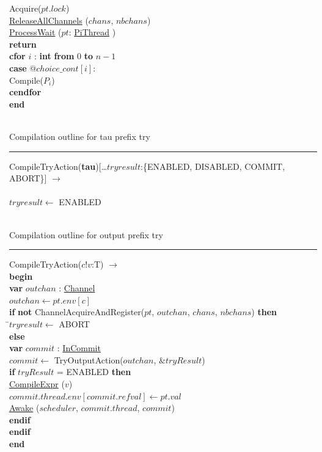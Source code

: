 \documentclass[a4paper,11pt]{article}
\newenvironment{program}{
  \begin{sffamily}
  \begin{scriptsize}
  \begin{tabbing}}
 {\end{tabbing}
  \end{scriptsize}
  \end{sffamily}}
\newcommand{\kw}[1]{\textsf{\textbf{#1}}}
\newcommand{\pindent}{\hspace{2em}\=}
\newcommand{\compiletime}[1]{\textcolor{compilecolor}{#1}}
\newcommand{\synchro}[1]{\textcolor{synchrocolor}{#1}}
\newcommand{\algotitle}[1]{\noindent\\ \noindent#1\par\nobreak\vspace{3pt}\hrule\vspace{6pt}}
\newcommand{\algosection}[1]{
  \phantomsection
  \algotitle{#1}
}
\newcommand{\myref}[1]{
  \hyperref[#1]{#1}
}
\begin{document}
\begin{program}
  \>\synchro{Acquire($pt.lock$)} \\
  \>\synchro{\myref{ReleaseAllChannels}($chans$, $nbchans$)} \\
  \>\synchro{\myref{ProcessWait}($pt$:\myref{PiThread})} \\
  \>\kw{return} \\
  \>\compiletime{\kw{cfor} $i$ : \kw{int} \kw{from} $0$ \kw{to} $n-1$} \\
  \>\pindent \kw{case} $@choice\_cont[i]:$ \\
  \>\>\compiletime{Compile($P_i$)} \\
  \>\compiletime{\kw{cendfor}} \\
  \kw{end}
\end{program}

\label{CompileTryAction}
\algosection{Compilation outline for tau prefix try}
\begin{program}
  \compiletime{CompileTryAction(\kw{tau})}[\ldots $tryresult$:\{ENABLED, DISABLED, COMMIT, ABORT\}] $\rightarrow$ \\ \\
  $tryresult \leftarrow$ ENABLED \\
\end{program}

\algosection{Compilation outline for output prefix try}
\begin{program}
  \compiletime{CompileTryAction($c!v$:T)} $\rightarrow$ \\ 
  \kw{begin} \\
  \pindent \kw{var} $outchan$ : \myref{Channel} \\
  \> $outchan \leftarrow pt.env[c]$ \\
  \> \kw{if} \kw{not} ChannelAcquireAndRegister($pt$, $outchan$, $chans$, $nbchans$) \kw{then} \\
  \> \pindent $tryresult \leftarrow$ ABORT \\
  \> \kw{else} \\
  \>\>\kw{var} $commit$ : \myref{InCommit} \\
  \>\> $commit \leftarrow$ TryOutputAction($outchan$, $\& tryResult$)\\
  \>\>\kw{if} $tryResult$ = ENABLED \kw{then} \\
  \>\>\pindent\compiletime{\myref{CompileExpr}($v$)} \\
  \>\>\>$commit.thread.env[commit.refval] \leftarrow pt.val$ \\
  \>\>\>\myref{Awake}($scheduler$, $commit.thread$, $commit$) \\
  \>\> \kw{endif}\\
  \>\kw{endif} \\
  \kw{end}
\end{program}
\end{document}
